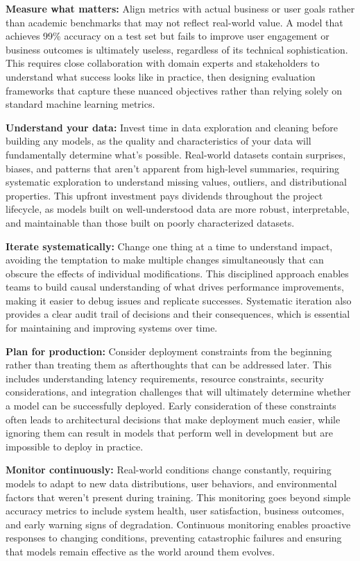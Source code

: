 \textbf{Measure what matters:} Align metrics with actual business or user goals rather than academic benchmarks that may not reflect real-world value. A model that achieves 99\% accuracy on a test set but fails to improve user engagement or business outcomes is ultimately useless, regardless of its technical sophistication. This requires close collaboration with domain experts and stakeholders to understand what success looks like in practice, then designing evaluation frameworks that capture these nuanced objectives rather than relying solely on standard machine learning metrics.

\textbf{Understand your data:} Invest time in data exploration and cleaning before building any models, as the quality and characteristics of your data will fundamentally determine what's possible. Real-world datasets contain surprises, biases, and patterns that aren't apparent from high-level summaries, requiring systematic exploration to understand missing values, outliers, and distributional properties. This upfront investment pays dividends throughout the project lifecycle, as models built on well-understood data are more robust, interpretable, and maintainable than those built on poorly characterized datasets.

\textbf{Iterate systematically:} Change one thing at a time to understand impact, avoiding the temptation to make multiple changes simultaneously that can obscure the effects of individual modifications. This disciplined approach enables teams to build causal understanding of what drives performance improvements, making it easier to debug issues and replicate successes. Systematic iteration also provides a clear audit trail of decisions and their consequences, which is essential for maintaining and improving systems over time.

\textbf{Plan for production:} Consider deployment constraints from the beginning rather than treating them as afterthoughts that can be addressed later. This includes understanding latency requirements, resource constraints, security considerations, and integration challenges that will ultimately determine whether a model can be successfully deployed. Early consideration of these constraints often leads to architectural decisions that make deployment much easier, while ignoring them can result in models that perform well in development but are impossible to deploy in practice.

\textbf{Monitor continuously:} Real-world conditions change constantly, requiring models to adapt to new data distributions, user behaviors, and environmental factors that weren't present during training. This monitoring goes beyond simple accuracy metrics to include system health, user satisfaction, business outcomes, and early warning signs of degradation. Continuous monitoring enables proactive responses to changing conditions, preventing catastrophic failures and ensuring that models remain effective as the world around them evolves.

